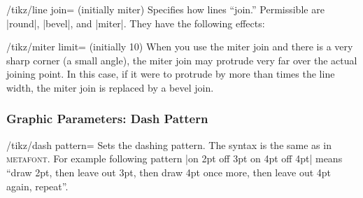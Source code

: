 \begin{key}{/tikz/line join= (initially miter)}
  Specifies how lines ``join.'' Permissible  are |round|,
  |bevel|, and |miter|. They have the following effects:

\begin{codeexample}[]
\end{codeexample}

  \begin{key}{/tikz/miter limit= (initially 10)}
    When you use the miter join and there is a very sharp corner (a
    small angle), the miter join may protrude very far over the actual
    joining point. In this case, if it were to protrude by 
    more than  times the line width, the miter join is
    replaced by a bevel join. 

\begin{codeexample}[]
\end{codeexample}
  \end{key}
\end{key}

\subsubsection{Graphic Parameters: Dash Pattern}

\begin{key}{/tikz/dash pattern=}
  Sets the dashing pattern. The syntax is the same as in
  \textsc{metafont}. For example following pattern
  |on 2pt off 3pt on 4pt off 4pt| means ``draw
  2pt, then leave out 3pt, then draw 4pt once more, then leave out 4pt
  again, repeat''. 

\begin{codeexample}[]
\begin{tikzpicture}[dash pattern=on 2pt off 3pt on 4pt off 4pt]
  \draw (0pt,0pt) -- (3.5cm,0pt);
\end{tikzpicture}
\end{codeexample}
\end{key}

